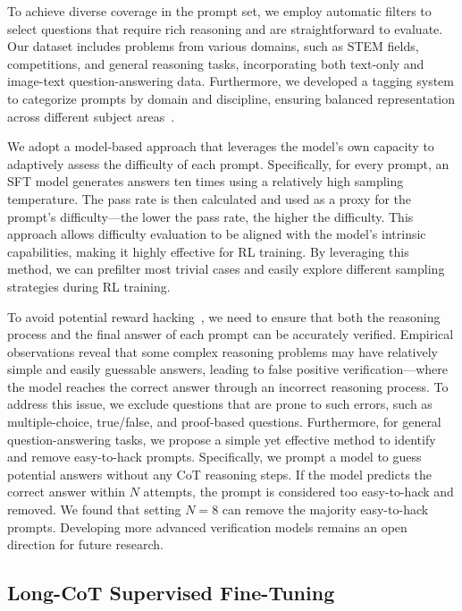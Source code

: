 \documentclass{article}
\newcommand{\citep}[1]{\parencite{#1}}
\begin{document}
To achieve diverse coverage in the prompt set, we employ automatic filters to select questions that require rich reasoning and are straightforward to evaluate.
Our dataset includes problems from various domains, such as STEM fields, competitions, and general reasoning tasks, incorporating both text-only and image-text question-answering data.
Furthermore, we developed a tagging system to categorize prompts by domain and discipline, ensuring balanced representation across different subject areas~\citep{li2023tagging,liu2023tagging}.

We adopt a model-based approach that leverages the model’s own capacity to adaptively assess the difficulty of each prompt.  
Specifically, for every prompt, an SFT model generates answers ten times using a relatively high sampling temperature. The pass rate is then calculated and used as a proxy for the prompt's difficulty—the lower the pass rate, the higher the difficulty. This approach allows difficulty evaluation to be aligned with the model’s intrinsic capabilities, making it highly effective for RL training. By leveraging this method, we can prefilter most trivial cases and easily explore different sampling strategies during RL training.

To avoid potential reward hacking~\citep{everitt2021rewardtamperingproblemssolutions,pan2022the}, we need to ensure that both the reasoning process and the final answer of each prompt can be accurately verified. 
Empirical observations reveal that some complex reasoning problems may have relatively simple and easily guessable answers, leading to false positive verification—where the model reaches the correct answer through an incorrect reasoning process.
To address this issue, we exclude questions that are prone to such errors, such as multiple-choice, true/false, and proof-based questions.
Furthermore, for general question-answering tasks, we propose a simple yet effective method to identify and remove easy-to-hack prompts.
Specifically, we prompt a model to guess potential answers without any CoT reasoning steps.
If the model predicts the correct answer within $N$ attempts, the prompt is considered too easy-to-hack and removed.
We found that setting $N=8$ can remove the majority easy-to-hack prompts. Developing more advanced verification models remains an open direction for future research.


\subsection{Long-CoT Supervised Fine-Tuning}
\label{sec:long_cot_sft}
\end{document}
